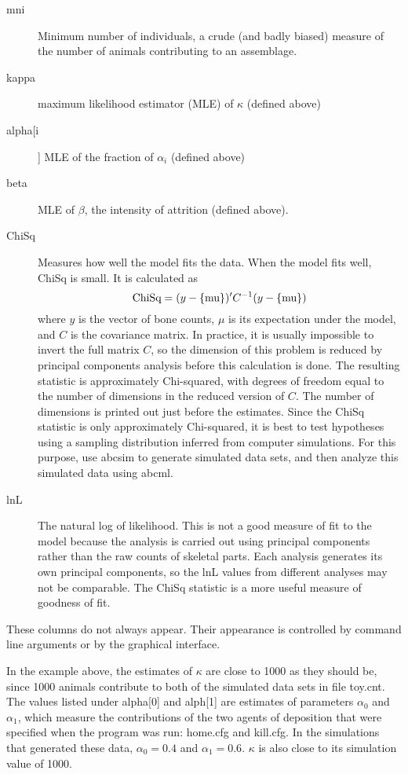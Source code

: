 \begin{description}
\item[mni]
Minimum number of individuals, a crude (and badly biased) measure of
the number of animals contributing to an assemblage.

\item[kappa]
maximum likelihood estimator (MLE) of $\kappa$ (defined above)

\item[alpha[i]]
MLE of the fraction of $\alpha_i$ (defined above)

\item[beta]
MLE of $\beta$, the intensity of attrition (defined above).

\item[ChiSq]
Measures how well the model fits the data.  When the model fits well,
ChiSq is small.  It is calculated as
\[
   \hbox{ChiSq} = (y - \mu)' C^{-1}  (y - \mu)
\]
where $y$ is the vector of bone counts, $\mu$ is its expectation under the
model, and $C$ is the covariance matrix.  In practice, it is usually
impossible to invert the full matrix $C$, so the dimension of this problem is
reduced by principal components analysis before this calculation is done.  The
resulting statistic is approximately Chi-squared, with degrees of freedom
equal to the number of dimensions in the reduced version of $C$.  The number of
dimensions is printed out just before the estimates.  Since the ChiSq
statistic is only approximately Chi-squared, it is best to test hypotheses
using a sampling distribution inferred from computer simulations.  For this
purpose, use abcsim to generate simulated data sets, and then analyze this
simulated data using abcml.

\item[lnL]
The natural log of likelihood.  This is not a good measure of fit to
the model because the analysis is carried out using principal
components rather than the raw counts of skeletal parts.  Each
analysis generates its own principal components, so the lnL values
from different analyses may not be comparable.  The ChiSq statistic is
a more useful measure of goodness of fit.
\end{description}
These columns do not always appear.  Their appearance is controlled by
command line arguments or by the graphical interface.
 
In the example above, the estimates of $\kappa$ are close to 1000 as they
should be, since 1000 animals contribute to both of the simulated data sets in
file toy.cnt.  The values listed under alpha[0] and alph[1] are estimates of
parameters $\alpha_0$ and $\alpha_1$, which measure the contributions of the
two agents of deposition that were specified when the program was run:
home.cfg and kill.cfg.  In the simulations that generated these data,
$\alpha_0=0.4$ and $\alpha_1=0.6$.  $\kappa$ is also close to its simulation
value of 1000.

